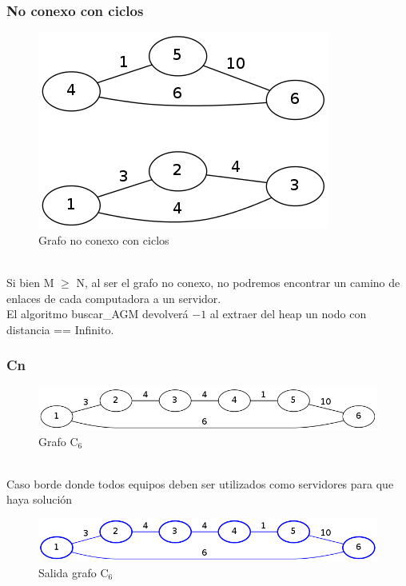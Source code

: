 \subsubsection{No conexo con ciclos}
\begin{figure}[h]
  \centering
    \includegraphics[scale=0.45]{ej3/caso2-1.png}
  \caption{Grafo no conexo con ciclos}
  \label{fig:ejemplo}
\end{figure}
~
\\
Si bien M $\geq$ N, al ser el grafo no conexo, no podremos encontrar un camino de enlaces de cada computadora a un servidor.\\
El algoritmo buscar\_AGM devolver\'a $-1$ al extraer del heap un nodo con distancia == Infinito.

\subsubsection{Cn}
\begin{figure}[h]
  \centering
    \includegraphics[scale=0.45]{ej3/caso1-1.png}
  \caption{Grafo C$_6$}
  \label{fig:ejemplo}
\end{figure}
~
\\
Caso borde donde todos equipos deben ser utilizados como servidores para que haya soluci\'on
\begin{figure}[h]
  \centering
    \includegraphics[scale=0.45]{ej3/caso1-2.png}
  \caption{Salida grafo C$_6$}
  \label{fig:ejemplo}
\end{figure}



